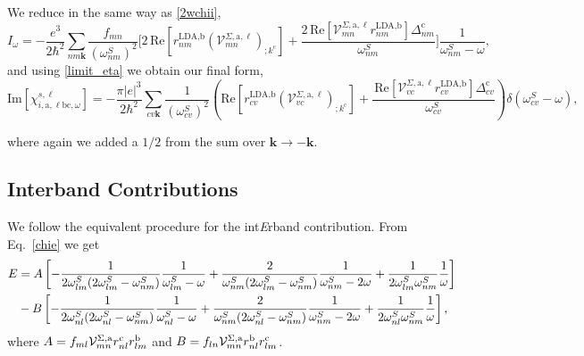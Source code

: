 We reduce in the same way as \eqref{2wchii}, 
\begin{equation}\label{wchii_simplified}
I_{\omega}
=   -\frac{e^3}{2\hbar^2}\sum_{nm\mathbf{k}}
    \frac{f_{mn}}{(\omega^{S}_{nm})^{2}}
\Biggl[
    2\,\mathrm{Re}\left[r^{\text{LDA,b}}_{nm}
    \left(\mathcal{V}^{\Sigma,\text{a},\ell}_{mn}\right)_{;k^{\text{c}}}\right]
+   \frac{2\,\mathrm{Re}\left[\mathcal{V}^{\Sigma,\text{a},\ell}_{mn}
    r^{\text{LDA,b}}_{nm}\right]\Delta^{\text{c}}_{nm}}{\omega^{S}_{nm}} 
\Biggr]\frac{1}{\omega^{S}_{nm}-\omega}
,
\end{equation}
and using \eqref{limit_eta} we obtain our final form,
\begin{equation}
\mathrm{Im}[\chi_{i,\text{a},\ell\text{b}\text{c},\omega}^{s,\ell}]
=   -\frac{\pi\vert e\vert^3}{2\hbar^2}
    \sum_{cv\mathbf{k}}\frac{1}{(\omega^{S}_{cv})^{2}}
\left(
    \mathrm{Re}\left[r^{\text{LDA,b}}_{cv}
    \left(\mathcal{V}^{\Sigma,\text{a},\ell}_{vc}\right)_{;k^{\text{c}}}\right]
+   \frac{\,\mathrm{Re}\left[\mathcal{V}^{\Sigma,\text{a},\ell}_{vc}
    r^{\text{LDA,b}}_{cv}\right]\Delta^{\text{c}}_{cv}}{\omega^{S}_{cv}} 
\right)\delta(\omega^{S}_{cv}-\omega)
,
\end{equation}

where again we added a $1/2$ from the sum over 
$\mathbf{k} \rightarrow - \mathbf{k}$.

\subsection{Interband Contributions}

We follow the equivalent procedure for the int{\it E}rband contribution. 
From Eq.~\eqref{chie} we get
\begin{align}\label{pfe}  
E&=  
A
\left[
-\frac{1}{2\omega^S_{lm}(2\omega^S_{lm}-\omega^S_{nm})}\frac{1}{\omega^S_{lm}-\omega}
+\frac{2}{\omega^S_{nm}(2\omega^S_{lm}-\omega^S_{nm})}\frac{1}{\omega^S_{nm}-2\omega}
+\frac{1}{2\omega^S_{lm}\omega^S_{nm}}\frac{1}{\omega}
\right]
\nonumber\\
&- 
B
\left[
-\frac{1}{2\omega^S_{nl}(2\omega^S_{nl}-\omega^S_{nm})}\frac{1}{\omega^S_{nl}-\omega}
+\frac{2}{\omega^S_{nm}(2\omega^S_{nl}-\omega^S_{nm})}\frac{1}{\omega^S_{nm}-2\omega}
+\frac{1}{2\omega^S_{nl}\omega^S_{nm}}\frac{1}{\omega}
\right]
,
\end{align}  
where 
$A=f_{ml}{\cal V}^{\Sigma,\mathrm{a}}_{mn}r^{\mathrm{c}}_{nl}r^{\mathrm{b}}_{lm}$   
and
$B=f_{ln}{\cal V}^{\Sigma,\mathrm{a}}_{mn}r^{\mathrm{b}}_{nl}r^{\mathrm{c}}_{lm}$.

